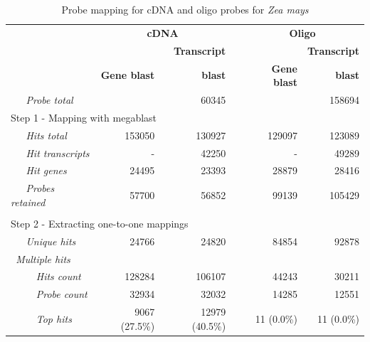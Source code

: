 \begin{table}
	\centering
	\begin{threeparttable}
	\begin{footnotesize}
	\caption{Probe mapping for cDNA and oligo probes for \textit{Zea mays}}
	\label{tab:magic-probemap}
	\begin{tabular}{@{}p{3cm}r|rcr|r}
	\toprule

	& \multicolumn{2}{c}{\textbf{cDNA}} & \phantom{a} & 
	\multicolumn{2}{c}{\textbf{Oligo}} \\
	
	\cmidrule{2-3} \cmidrule{5-6}
	
	& & \textbf{Transcript}	&& & \textbf{Transcript} \\
	& \textbf{Gene blast} & \textbf{blast} && \textbf{Gene blast}	& 
	\textbf{blast} \\
	
	\midrule
	
	{\it ~~~Probe total\tnote{2}} & \multicolumn{2}{r}{60345} &&	
			\multicolumn{2}{r}{158694} \\[1.5ex]

		\multicolumn{6}{l}{Step 1 - Mapping with megablast} \\[.2ex]
	{\it ~~~Hits total\tnote{3}} & 153050 & 130927 && 129097 & 123089 \\
	{\it ~~~Hit transcripts\tnote{4}} & - & 42250 && - & 49289 \\
	{\it ~~~Hit genes\tnote{5}} & 24495 & 23393 && 28879 & 
	28416 \\
	{\it ~~~Probes retained} & 57700 & 56852 && 99139 & 105429 \\
	
	\multicolumn{6}{l}{}\\
		
		\multicolumn{6}{l}{Step 2 - Extracting one-to-one mappings} 
		\\[.2ex]
	{\it ~~~Unique hits\tnote{6}} & 24766 & 24820 && 84854 & 92878 \\
	\multicolumn{6}{l}{{\it ~Multiple hits}} \\
	{\it ~~~~~Hits count\tnote{3}} & 128284 & 106107 && 44243 & 30211 \\
	{\it ~~~~~Probe count} & 32934 & 32032 && 14285 & 12551 \\
	{\it ~~~~~Top hits\tnote{7}} & 9067 (27.5\%) & 12979 (40.5\%) && 11 (0.0\%) 
	& 11 (0.0\%)\\
	

\end{tabular}
\end{footnotesize}
\end{threeparttable}
\end{table}
